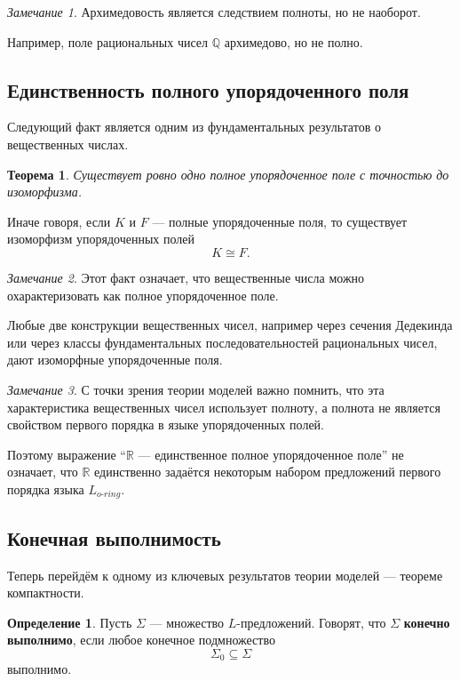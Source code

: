 \documentclass[12pt,a4paper,oneside,openany]{book}
\theoremstyle{definition}
\newtheorem{definition}{Определение}[chapter]
\theoremstyle{plain}
\newtheorem{theorem}{Теорема}[chapter]
\theoremstyle{remark}
\newtheorem{remark}{Замечание}[chapter]
\begin{document}
\begin{remark}
Архимедовость является следствием полноты, но не наоборот.

Например, поле рациональных чисел $\mathbb Q$ архимедово, но не полно.
\end{remark}

\subsection{Единственность полного упорядоченного поля}

Следующий факт является одним из фундаментальных результатов о вещественных числах.

\begin{theorem}
Существует ровно одно полное упорядоченное поле с точностью до изоморфизма.
\end{theorem}

Иначе говоря, если $K$ и $F$ — полные упорядоченные поля, то существует изоморфизм упорядоченных полей
\[
K\cong F.
\]

\begin{remark}
Этот факт означает, что вещественные числа можно охарактеризовать как полное упорядоченное поле.

Любые две конструкции вещественных чисел, например через сечения Дедекинда или через классы фундаментальных последовательностей рациональных чисел, дают изоморфные упорядоченные поля.
\end{remark}

\begin{remark}
С точки зрения теории моделей важно помнить, что эта характеристика вещественных чисел использует полноту, а полнота не является свойством первого порядка в языке упорядоченных полей.

Поэтому выражение ``$\mathbb R$ — единственное полное упорядоченное поле'' не означает, что $\mathbb R$ единственно задаётся некоторым набором предложений первого порядка языка $L_{o\text{-}ring}$.
\end{remark}

\subsection{Конечная выполнимость}

Теперь перейдём к одному из ключевых результатов теории моделей — теореме компактности.

\begin{definition}
Пусть $\Sigma$ — множество $L$-предложений. Говорят, что $\Sigma$ \textbf{конечно выполнимо}, если любое конечное подмножество
\[
\Sigma_0\subseteq\Sigma
\]
выполнимо.
\end{definition}
\end{document}
